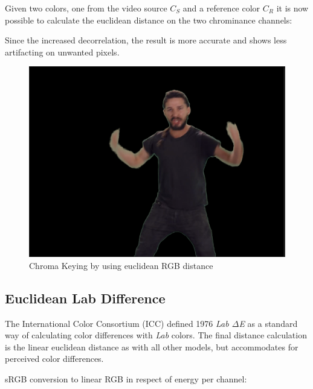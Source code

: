 Given two colors, one from the video source $C_S$ and a reference color $C_R$ 
it is now possible to calculate the euclidean distance on the two chrominance 
channels:


Since the increased decorrelation, the result is more accurate and shows less 
artifacting on unwanted pixels.

\begin{figure}[htb]
	\includegraphics[width=\textwidth]{_raw_resources/Comparison_YCgCo_color.png}
	\caption{Chroma Keying by using euclidean RGB distance}
	\label{fig:chroma:euclidean:ycgco}
\end{figure}

\subsection{Euclidean Lab Difference}
The International Color Consortium (ICC) defined 1976 \textit{Lab $\Delta$E} as 
a standard way of calculating color differences with \textit{Lab} colors. The 
final distance calculation is the linear euclidean distance as with all other 
models, but accommodates for perceived color differences.


sRGB conversion to linear RGB in respect of energy per channel:


